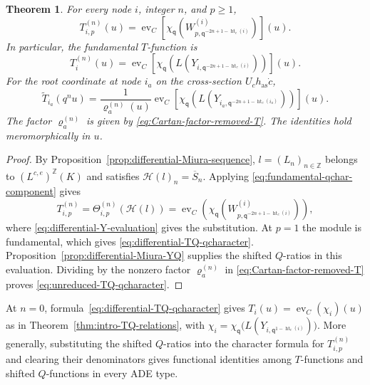 \documentclass[11pt,leqno]{amsart}
\numberwithin{equation}{section}
\theoremstyle{plain}
\newtheorem{theorem}{Theorem}[section]
\theoremstyle{definition}
\theoremstyle{plain}
\theoremstyle{definition}
\theoremstyle{remark}
\newcommand{\qaff}{\mathsf q}
\begin{document}
\begin{theorem}\label{thm:differential-qcharacter}\label{cor:higher-T-qcharacter}
For every node $i$, integer $n$, and $p\geq1$,
\begin{equation}\label{eq:theta-fundamental-module}
 T_{i,p}^{(n)}(u)
   =\operatorname{ev}_C\!\left[
       \chi_{\qaff}\!\left(
          W^{(i)}_{p,\qaff^{-2n+1-\operatorname{ht}_c(i)}}\right)\right](u).
\end{equation}
In particular, the fundamental $T$-function is
\begin{equation}\label{eq:differential-TQ-qcharacter}
 T_i^{(n)}(u)
  =\operatorname{ev}_C\!\left[
       \chi_{\qaff}\!\left(
          L(Y_{i,\qaff^{-2n+1-\operatorname{ht}_c(i)}})\right)\right](u).
\end{equation}
For the root coordinate at node $i_a$ on the cross-section $U_ch_{\mathrm{as}}\dot c$,
\begin{equation}\label{eq:unreduced-TQ-qcharacter}
 \widetilde T_{i_a}(q^nu)
   =\frac{1}{\varrho_a^{(n)}(u)}
      \operatorname{ev}_C\!\left[
       \chi_{\qaff}\!\left(
        L(Y_{i_a,\qaff^{-2n+1-\operatorname{ht}_c(i_a)}})\right)\right](u).
\end{equation}
The factor $\varrho_a^{(n)}$ is given by \eqref{eq:Cartan-factor-removed-T}.  The identities hold meromorphically in $u$.
\end{theorem}
\begin{proof}
By Proposition~\ref{prop:differential-Miura-sequence}, $l=(L_n)_{n\in\mathbb Z}$ belongs to $(L^{c,e})^{\mathbb Z}(K)$ and satisfies $\mathcal H(l)_n=\overline S_n$.  Applying \eqref{eq:fundamental-qchar-component} gives
\[
 T_{i,p}^{(n)}
 =\Theta_{i,p}^{(n)}(\mathcal H(l))
 =\operatorname{ev}_C\!\left(
       \chi_{\qaff}\!\left(W^{(i)}_{p,\qaff^{-2n+1-\operatorname{ht}_c(i)}}\right)\right),
\]
where \eqref{eq:differential-Y-evaluation} gives the substitution.  At $p=1$ the module is fundamental, which gives \eqref{eq:differential-TQ-qcharacter}.  Proposition~\ref{prop:differential-Miura-YQ} supplies the shifted $Q$-ratios in this evaluation.  Dividing by the nonzero factor $\varrho_a^{(n)}$ in \eqref{eq:Cartan-factor-removed-T} proves \eqref{eq:unreduced-TQ-qcharacter}.
\end{proof}

At $n=0$, formula~\eqref{eq:differential-TQ-qcharacter} gives $T_i(u)=\operatorname{ev}_C(\chi_i)(u)$ as in Theorem~\ref{thm:intro-TQ-relations}, with $\chi_i=\chi_{\qaff}\bigl(L(Y_{i,\qaff^{1-\operatorname{ht}_c(i)}})\bigr)$.  More generally, substituting the shifted $Q$-ratios into the character formula for $T_{i,p}^{(n)}$ and clearing their denominators gives functional identities among $T$-functions and shifted $Q$-functions in every ADE type.
\end{document}
